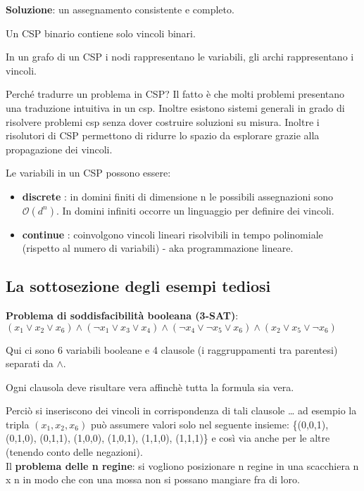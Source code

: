 \textbf{Soluzione}: un assegnamento consistente e completo.

Un CSP binario contiene solo vincoli binari.

In un grafo di un CSP i nodi rappresentano le variabili, gli archi rappresentano
i vincoli.

Perché tradurre un problema in CSP? Il fatto è che molti problemi presentano
una traduzione intuitiva in un csp. Inoltre esistono sistemi generali in grado di
risolvere problemi csp senza dover costruire soluzioni su misura.
Inoltre i risolutori di CSP permettono di ridurre lo spazio da esplorare grazie
alla propagazione dei vincoli.

Le variabili in un CSP possono essere:

\begin{itemize}
 \item \textbf{discrete} : in domini finiti di dimensione n le possibili
assegnazioni sono $\mathcal{O}(d^n)$. In domini infiniti occorre un linguaggio
per definire dei vincoli.
 \item \textbf{continue} : coinvolgono vincoli lineari risolvibili in tempo
polinomiale (rispetto al numero di variabili) - aka programmazione lineare.
\end{itemize}

\subsection{La sottosezione degli esempi tediosi}

\textbf{Problema di soddisfacibilità booleana (3-SAT)}:\\

$(x_1 \lor x_2 \lor x_6) \land (\neg x_1 \lor x_3 \lor x_4) \land
(\neg x_4 \lor \neg x_5 \lor x_6) \land (x_2 \lor x_5 \lor \neg x_6)$

Qui ci sono 6 variabili booleane e 4 clausole (i raggruppamenti tra parentesi)
separati da $\land$.

Ogni clausola deve risultare vera affinchè tutta la formula sia
vera.

Perciò si inseriscono dei vincoli in corrispondenza di tali clausole \dots
ad esempio la tripla $(x_1, x_2, x_6)$ può assumere valori solo nel seguente
insieme: \{(0,0,1), (0,1,0), (0,1,1), (1,0,0), (1,0,1), (1,1,0), (1,1,1)\} e
così via anche per le altre (tenendo conto delle negazioni).\\

Il \textbf{problema delle n regine}: si vogliono posizionare n regine in
una scacchiera n x n in modo che con una mossa non si possano mangiare
fra di loro.\\

